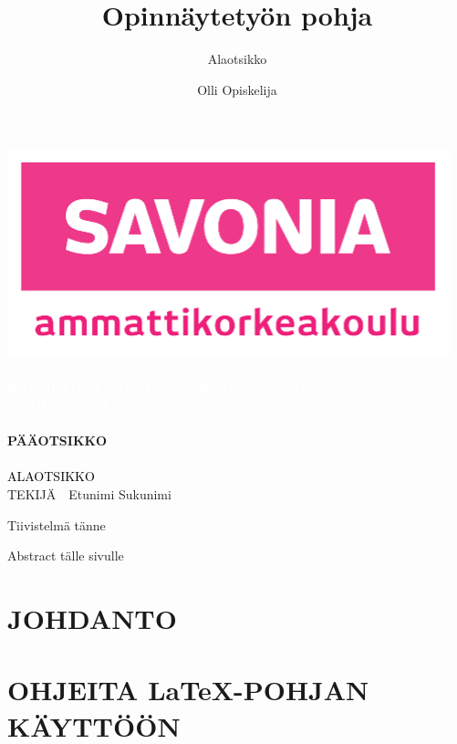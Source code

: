 \documentclass[a4paper, 11pt, oneside, finnish]{scrartcl}
\author{Olli Opiskelija}
\title{Opinnäytetyön pohja}
\subtitle{Alaotsikko}
\begin{document}
\begin{titlepage}
  \vspace{-1cm}
  \hspace{-0.8cm}
  \includegraphics[scale=1]{savonia_ammattikorkeakoulu.png}\\[\bigskipamount]
  \noindent\makebox[\linewidth]{\textcolor{savoniamagenta}{  \hspace{-1cm}\rule{\paperwidth}{2cm}}}
  \vspace{-2.25cm}
  \textcolor{white}{
    \textbf{
      \large{\ \\ %
RAPORTIN TYYPPI -- TUTKINNON TASO\\[1.3ex]
KOULUTUSALA\\
      }
    }
  }
  \vspace{2cm}
  \textcolor{savoniamagenta}{
    \textbf{
      \huge{  \ \\ %
PÄÄOTSIKKO\\
      }
    }
  }
  \textcolor{black}{
    \large{\ \\ %
ALAOTSIKKO\\[11.5cm]
    }
  }
TEKIJÄ\ \ Etunimi Sukunimi
\end{titlepage}

Tiivistelmä tänne
\pagebreak

Abstract tälle sivulle
\pagebreak

\tableofcontents
\pagebreak

\section{JOHDANTO}

\section{OHJEITA LaTeX-POHJAN KÄYTTÖÖN}
\end{document}
